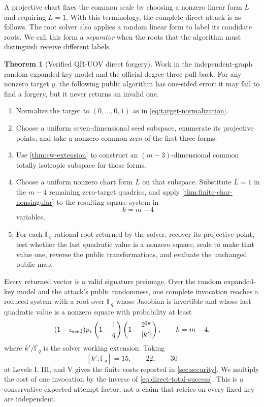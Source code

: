 \documentclass[11pt,a4paper]{article}
\theoremstyle{definition}
\newtheorem{theorem}{Theorem}[section]
\theoremstyle{remark}
\newcommand{\F}{\mathbb F}
\begin{document}
A projective chart fixes the common scale by choosing a nonzero linear form
$L$ and requiring $L=1$.  With this terminology, the complete direct attack
is as follows.  The root solver also applies a random linear form to label its
candidate roots.  We call this form a \emph{separator} when the roots that the
algorithm must distinguish receive different labels.

\begin{theorem}[Verified QR-UOV direct forgery]\label{thm:verified-direct-forgery}
Work in the independent-graph random expanded-key model and the official degree-three
pull-back.  For any nonzero target $y$, the following public algorithm has
one-sided error: it may fail to find a forgery, but it never returns an invalid
one.
\begin{enumerate}
\item Normalize the target to $(0,\ldots,0,1)$ as in
\eqref{eq:target-normalization}.
\item Choose a uniform seven-dimensional seed subspace, enumerate its
projective points, and take a nonzero common zero of the first three forms.
\item Use \cref{thm:cw-extension} to construct an $(m-3)$-dimensional common
totally isotropic subspace for those forms.
\item Choose a uniform nonzero chart form $L$ on that subspace.  Substitute
$L=1$ in the $m-4$ remaining zero-target quadrics, and apply
\cref{thm:finite-char-nonsingular} to the resulting square system in
\[
 k=m-4
\]
variables.
\item For each $\F_q$-rational root returned by the solver, recover its projective point,
test whether the last quadratic value is a nonzero square, scale to make that
value one, reverse the public transformations, and evaluate the unchanged
public map.
\end{enumerate}
Every returned vector is a valid signature preimage.  Over the random
expanded-key model and the attack's public randomness, one complete invocation
reaches a reduced system with a root over $\F_q$ whose Jacobian is invertible
and whose last quadratic value is a nonzero square with probability at least
\begin{equation}\label{eq:direct-total-success}
 (1-\epsilon_{\rm seed})p_*
 \left(1-\frac1q\right)
 \left(1-\frac{2^{2k}}{|k'|}\right),
 \qquad k=m-4,
\end{equation}
where $k'/\F_q$ is the solver working extension.  Taking
\[
 [k':\F_q]=15,\qquad22,\qquad30
\]
at Levels I, III, and V gives the finite costs reported in
\cref{sec:security}.  We multiply the cost of one invocation by the inverse of
\eqref{eq:direct-total-success}.  This is a conservative expected-attempt
factor, not a claim that retries on every fixed key are independent.
\end{theorem}
\end{document}
